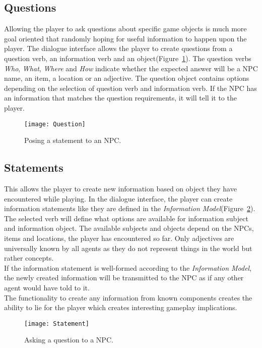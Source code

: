 \subsection{Questions}
Allowing the player to ask questions about specific game objects is much more goal oriented that randomly hoping for useful information to happen upon the player. The dialogue interface allows the player to create questions from a question verb, an information verb and an object(Figure~\ref{fig:question}). The question verbs \textit{Who}, \textit{What}, \textit{Where} and \textit{How} indicate whether the expected answer will be a NPC name, an item, a location or an adjective. The question object contains options depending on the selection of question verb and information verb. If the NPC has an information that matches the question requirements, it will tell it to the player.
\begin{figure}
	\centering
	\texttt{[image: Question]}
	\caption{Posing a statement to an NPC.}
	\label{fig:question}
\end{figure}
\subsection{Statements}
This allows the player to create new information based on object they have encountered while playing. In the dialogue interface, the player can create information statements like they are defined in the \textit{Information Model}(Figure~\ref{fig:statement}). The selected verb will define what options are available for information subject and information object. The available subjects and objects depend on the NPCs, items and locations, the player has encountered so far. Only adjectives are universally known by all agents as they do not represent things in the world but rather concepts.\\
If the information statement is well-formed according to the \textit{Information Model}, the newly created information will be transmitted to the NPC as if any other agent would have told to it.\\
The functionality to create any information from known components creates the ability to lie for the player which creates interesting gameplay implications.
\begin{figure}
	\centering
	\texttt{[image: Statement]}
	\caption{Asking a question to a NPC.}
	\label{fig:statement}
\end{figure}

